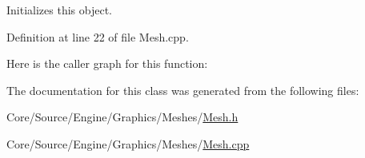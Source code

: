 Initializes this object. 



Definition at line 22 of file Mesh.\+cpp.

Here is the caller graph for this function\+:


The documentation for this class was generated from the following files\+:\begin{DoxyCompactItemize}
\item 
Core/\+Source/\+Engine/\+Graphics/\+Meshes/\mbox{\hyperlink{_mesh_8h}{Mesh.\+h}}\item 
Core/\+Source/\+Engine/\+Graphics/\+Meshes/\mbox{\hyperlink{_mesh_8cpp}{Mesh.\+cpp}}\end{DoxyCompactItemize}
